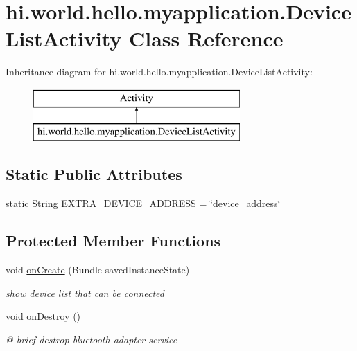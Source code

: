 \hypertarget{classhi_1_1world_1_1hello_1_1myapplication_1_1_device_list_activity}{}\section{hi.\+world.\+hello.\+myapplication.\+Device\+List\+Activity Class Reference}
\label{classhi_1_1world_1_1hello_1_1myapplication_1_1_device_list_activity}
Inheritance diagram for hi.\+world.\+hello.\+myapplication.\+Device\+List\+Activity\+:\begin{figure}[H]
\begin{center}
\leavevmode
\includegraphics[height=2.000000cm]{classhi_1_1world_1_1hello_1_1myapplication_1_1_device_list_activity}
\end{center}
\end{figure}
\subsection*{Static Public Attributes}
\begin{DoxyCompactItemize}
\item 
static String \mbox{\hyperlink{classhi_1_1world_1_1hello_1_1myapplication_1_1_device_list_activity_ab8c0c73b995417e0162ceb97cdf28a5d}{E\+X\+T\+R\+A\+\_\+\+D\+E\+V\+I\+C\+E\+\_\+\+A\+D\+D\+R\+E\+SS}} = \char`\"{}device\+\_\+address\char`\"{}
\end{DoxyCompactItemize}
\subsection*{Protected Member Functions}
\begin{DoxyCompactItemize}
\item 
void \mbox{\hyperlink{classhi_1_1world_1_1hello_1_1myapplication_1_1_device_list_activity_a6d0313ab175b34a19dc6a6bf987a2b0f}{on\+Create}} (Bundle saved\+Instance\+State)
\begin{DoxyCompactList}\small\item\em show device list that can be connected \end{DoxyCompactList}\item 
void \mbox{\hyperlink{classhi_1_1world_1_1hello_1_1myapplication_1_1_device_list_activity_a0e6e1dfdd4e73c1e759f9c3f02f6bf64}{on\+Destroy}} ()
\begin{DoxyCompactList}\small\item\em @ brief destrop bluetooth adapter service \end{DoxyCompactList}\end{DoxyCompactItemize}
